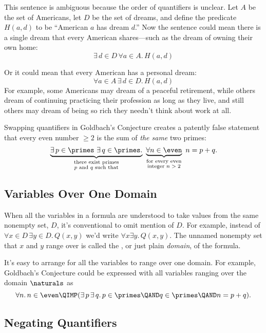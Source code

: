 This sentence is ambiguous because the order of quantifiers is
unclear.  Let $A$ be the set of Americans, let $D$ be the set of
dreams, and define the predicate $H(a, d)$ to be ``American $a$ has
dream $d$.''  Now the sentence could mean there is a single dream
that every American shares---such as the dream of owning their own
home:
\[
\exists\, d \in D\, \forall a \in A.\, H(a, d)
\]

Or it could mean that every American has a personal dream:
\[
\forall a \in A\, \exists\, d \in D.\, H(a, d)
\]
For example, some Americans may dream of a peaceful retirement, while
others dream of continuing practicing their profession as long as they
live, and still others may dream of being so rich they needn't think
about work at all.

Swapping quantifiers in Goldbach's Conjecture creates a patently false
statement that every even number $\geq 2$ is the sum of \emph{the same}
two primes:
\[
\underbrace{\exists\, p \in \primes\ \exists\, q \in \primes.}_{\substack
    {\text{there exist primes} \\
     \text{$p$ and $q$ such that}}}
\
\underbrace{\forall n \in \even}_{\substack
    {\text{for every even} \\
     \text{integer $n > 2$}}}
\ n = p + q.
\]

\subsection{Variables Over One Domain}
When all the variables in a formula are understood to take values from the
same nonempty set, $D$, it's conventional to omit mention of $D$.  For
example, instead of $\forall x \in D\, \exists y \in D.\, Q(x,y)$ we'd
write $\forall x \exists y.\, Q(x,y)$.  The unnamed nonempty set that $x$
and $y$ range over is called the \term{domain of discourse}, or just plain
\emph{domain}, of the formula.

It's easy to arrange for all the variables to range over one domain.  For
example, Goldbach's Conjecture could be expressed with all variables
ranging over the domain $\naturals$ as
\[
\forall n.\, n \in \even \QIMP (\exists\, p\, \exists\, q.\, p \in \primes \QAND
q \in \primes \QAND n = p + q).
\]

\subsection{Negating Quantifiers}

